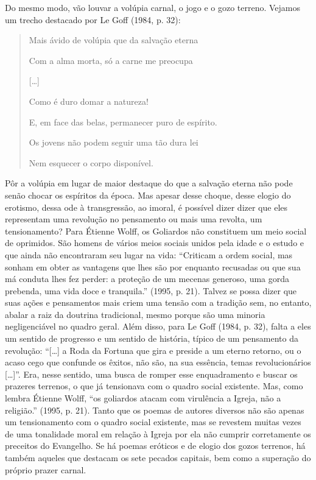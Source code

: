 Do mesmo modo, vão louvar a volúpia carnal, o jogo e o gozo terreno.
Vejamos um trecho destacado por Le Goff (1984, p. 32):

\begin{quote}
\forceindent{}Mais ávido de volúpia que da salvação eterna

Com a alma morta, só a carne me preocupa

[\ldots{}]

Como é duro domar a natureza!

E, em face das belas, permanecer puro de espírito.

Os jovens não podem seguir uma tão dura lei

Nem esquecer o corpo disponível.
\end{quote}

Pôr a volúpia em lugar de maior destaque do que a salvação eterna não
pode senão chocar os espíritos da época. Mas apesar desse choque, desse
elogio do erotismo, dessa ode à transgressão, ao imoral, é possível dizer
dizer que eles representam uma revolução no pensamento ou mais uma
revolta, um tensionamento? Para Étienne Wolff, os Goliardos não constituem um
meio social de oprimidos. São homens de vários meios sociais unidos pela
idade e o estudo e que ainda não encontraram seu lugar na vida:
``Criticam a ordem social, mas sonham em obter as vantagens que lhes são
por enquanto recusadas ou que sua má conduta lhes fez perder: a proteção
de um mecenas generoso, uma gorda prebenda, uma vida doce e tranquila.''
(1995, p. 21). Talvez se possa dizer que suas ações e pensamentos mais
criem uma tensão com a tradição sem, no entanto, abalar a raiz da
doutrina tradicional, mesmo porque são uma minoria negligenciável no
quadro geral. Além disso, para Le Goff (1984, p. 32), falta a eles um
sentido de progresso e um sentido de história, típico de um pensamento
da revolução: ``[\ldots{}] a Roda da Fortuna que gira e preside a um
eterno retorno, ou o acaso cego que confunde os êxitos, não são, na sua
essência, temas revolucionários [\ldots{}]''. Era, nesse sentido, uma
busca de romper esse enquadramento e buscar os prazeres terrenos, o que
já tensionava com o quadro social existente. Mas, como lembra Étienne
Wolff, ``os goliardos atacam com virulência a Igreja, não a religião.''
(1995, p. 21). Tanto que os poemas de autores diversos não são apenas um
tensionamento com o quadro social existente, mas se revestem muitas
vezes de uma tonalidade moral em relação à Igreja por ela não cumprir
corretamente os preceitos do Evangelho. Se há poemas eróticos e de
elogio dos gozos terrenos, há também aqueles que destacam os sete
pecados capitais, bem como a superação do próprio prazer carnal.

